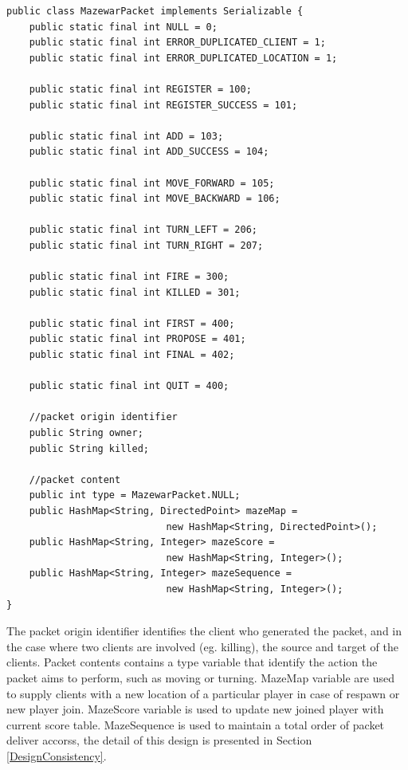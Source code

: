 {
\singlespacing
\begin{lstlisting}[caption = {[MazewarPacket.java]Structure of packets exchanged between players}, label = CodeMazewarPacket]
public class MazewarPacket implements Serializable {
    public static final int NULL = 0;
    public static final int ERROR_DUPLICATED_CLIENT = 1;
    public static final int ERROR_DUPLICATED_LOCATION = 1;

    public static final int REGISTER = 100;
    public static final int REGISTER_SUCCESS = 101;

    public static final int ADD = 103;
    public static final int ADD_SUCCESS = 104;

    public static final int MOVE_FORWARD = 105;
    public static final int MOVE_BACKWARD = 106;

    public static final int TURN_LEFT = 206;
    public static final int TURN_RIGHT = 207;

    public static final int FIRE = 300;
    public static final int KILLED = 301;

    public static final int FIRST = 400;
    public static final int PROPOSE = 401;
    public static final int FINAL = 402;

    public static final int QUIT = 400;

    //packet origin identifier
    public String owner;
    public String killed;

	//packet content
    public int type = MazewarPacket.NULL;
    public HashMap<String, DirectedPoint> mazeMap = 
    						new HashMap<String, DirectedPoint>();
    public HashMap<String, Integer> mazeScore = 
    						new HashMap<String, Integer>();
    public HashMap<String, Integer> mazeSequence = 
    						new HashMap<String, Integer>();
}
\end{lstlisting}
}

The packet origin identifier identifies the client who generated the packet, and in the case where two clients are involved (eg. killing), the source and target of the clients. Packet contents contains a type variable that identify the action the packet aims to perform, such as moving or turning. MazeMap variable are used to supply clients with a new location of a particular player in case of respawn or new player join. MazeScore variable is used to update new joined player with current score table. MazeSequence is used to maintain a total order of packet deliver accorss, the detail of this design is presented in Section \ref{DesignConsistency}.

